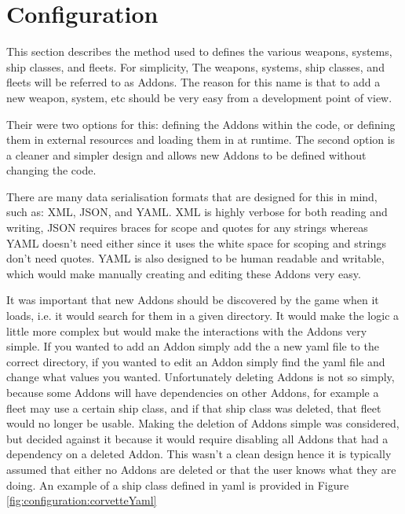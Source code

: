 \section{Configuration}

% 

This section describes the method used to defines the various weapons, systems, ship classes, and fleets.
For simplicity, The weapons, systems, ship classes, and fleets will be referred to as Addons.
The reason for this name is that to add a new weapon, system, etc should be very easy from a development point of view.

Their were two options for this: defining the Addons within the code, or defining them in external resources and loading them in at runtime.
The second option is a cleaner and simpler design and allows new Addons to be defined without changing the code.

There are many data serialisation formats that are designed for this in mind, such as: XML, JSON, and YAML.
XML is highly verbose for both reading and writing, JSON requires braces for scope and quotes for any strings whereas YAML doesn't need either since it uses the white space for scoping and strings don't need quotes.
YAML is also designed to be human readable and writable, which would make manually creating and editing these Addons very easy.

It was important that new Addons should be discovered by the game when it loads, i.e. it would search for them in a given directory.
It would make the logic a little more complex but would make the interactions with the Addons very simple.
If you wanted to add an Addon simply add the a new yaml file to the correct directory, if you wanted to edit an Addon simply find the yaml file and change what values you wanted.
Unfortunately deleting Addons is not so simply, because some Addons will have dependencies on other Addons, for example a fleet may use a certain ship class, and if that ship class was deleted, that fleet would no longer be usable.
Making the deletion of Addons simple was considered, but decided against it because it would require disabling all Addons that had a dependency on a deleted Addon. This wasn't a clean design hence it is typically assumed that either no Addons are deleted or that the user knows what they are doing.
An example of a ship class defined in yaml is provided in Figure \ref{fig:configuration:corvetteYaml}


